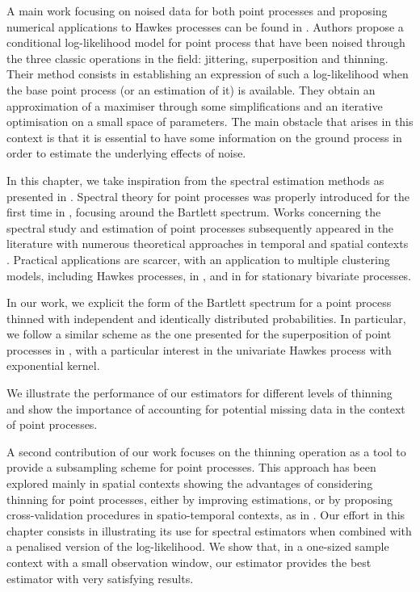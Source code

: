 A main work focusing on noised data for both point processes and proposing numerical applications to Hawkes processes can be found in \textcite{Lund2000}. 
Authors propose a conditional log-likelihood model for point process that have been noised through the three classic operations in the field: jittering, superposition and thinning. 
Their method consists in establishing an expression of such a log-likelihood when the base point process (or an estimation of it) is available.
They obtain an approximation of a maximiser through some simplifications and an iterative optimisation on a small space of parameters.
The main obstacle that arises in this context is that it is essential to have some information on the ground process in order to estimate the underlying effects of noise.

In this chapter, we take inspiration from the spectral estimation methods as presented in \textcite{Cheysson2022, Bonnet2024}.
Spectral theory for point processes was properly introduced for the first time in \textcite{Bartlett1963},
focusing around the Bartlett spectrum. 
Works concerning the spectral study and estimation of point processes subsequently appeared in the literature with numerous theoretical approaches in temporal and spatial contexts \parencite{Daley1971, Tuan1981, Mugglestone2001, Rajala2023}. Practical applications are scarcer, with an application to multiple clustering models, including Hawkes processes, in \textcite{Adamopoulos1976}, and in \textcite{Karavasilis2007} for stationary bivariate processes.

In our work, we explicit the form of the Bartlett spectrum for a point process thinned with independent and identically distributed probabilities. In particular, we follow a similar scheme as the one presented for the superposition of point processes in \textcite{Bonnet2024}, with a particular interest in the univariate Hawkes process with exponential kernel.

We illustrate the performance of our estimators for different levels of thinning and show the importance of accounting for potential missing data in the context of point processes.

A second contribution of our work focuses on the thinning operation as a tool to provide a subsampling scheme for point processes.
This approach has been explored mainly in spatial contexts \parencite{Moller2003, Moradi2019, Cronie2024} showing the advantages of considering thinning for point processes, 
either by improving estimations, or by proposing cross-validation procedures in spatio-temporal contexts, as in \textcite{Coeurjolly2024}.
Our effort in this chapter consists in illustrating its use for spectral estimators when combined with a penalised version of the log-likelihood.
We show that, in a one-sized sample context with a small observation window, 
our estimator provides the best estimator with very satisfying results.

